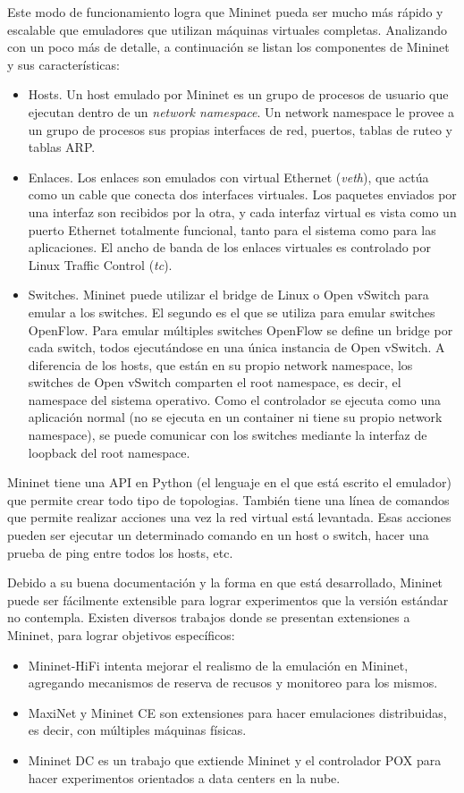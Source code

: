 Este modo de funcionamiento logra que Mininet pueda ser mucho más rápido y escalable que emuladores que utilizan máquinas virtuales completas. Analizando con un poco más de detalle, a continuación se listan los componentes de Mininet y sus características:
\begin{itemize}
	\item Hosts. Un host emulado por Mininet es un grupo de procesos de usuario que ejecutan dentro de un \textit{network namespace}. Un network namespace le provee a un grupo de procesos sus propias interfaces de red, puertos, tablas de ruteo y tablas ARP.
	\item Enlaces. Los enlaces son emulados con virtual Ethernet (\textit{veth}), que actúa como un cable que conecta dos interfaces virtuales. Los paquetes enviados por una interfaz son recibidos por la otra, y cada interfaz virtual es vista como un puerto Ethernet totalmente funcional, tanto para el sistema como para las aplicaciones. El ancho de banda de los enlaces virtuales es controlado por Linux Traffic Control (\textit{tc}).
	\item Switches. Mininet puede utilizar el bridge de Linux o Open vSwitch para emular a los switches. El segundo es el que se utiliza para emular switches OpenFlow. Para emular múltiples switches OpenFlow se define un bridge por cada switch, todos ejecutándose en una única instancia de Open vSwitch. A diferencia de los hosts, que están en su propio network namespace, los switches de Open vSwitch comparten el root namespace, es decir, el namespace del sistema operativo. Como el controlador se ejecuta como una aplicación normal (no se ejecuta en un container ni tiene su propio network namespace), se puede comunicar con los switches mediante la interfaz de loopback del root namespace.
\end{itemize}

Mininet tiene una API en Python (el lenguaje en el que está escrito el emulador) que permite crear todo tipo de topologias. También tiene una línea de comandos que permite realizar acciones una vez la red virtual está levantada. Esas acciones pueden ser ejecutar un determinado comando en un host o switch, hacer una prueba de ping entre todos los hosts, etc.

Debido a su buena documentación y la forma en que está desarrollado, Mininet puede ser fácilmente extensible para lograr experimentos que la versión estándar no contempla. Existen diversos trabajos donde se presentan extensiones a Mininet, para lograr objetivos específicos:
\begin{itemize}
	\item Mininet-HiFi \cite{mininet-hifi} intenta mejorar el realismo de la emulación en Mininet, agregando mecanismos de reserva de recusos y monitoreo para los mismos.
	\item MaxiNet \cite{maxinet} y Mininet CE \cite{mininet-ce} son extensiones para hacer emulaciones distribuidas, es decir, con múltiples máquinas físicas.
	\item Mininet DC \cite{mininet-dc} es un trabajo que extiende Mininet y el controlador POX para hacer experimentos orientados a data centers en la nube.
\end{itemize}

